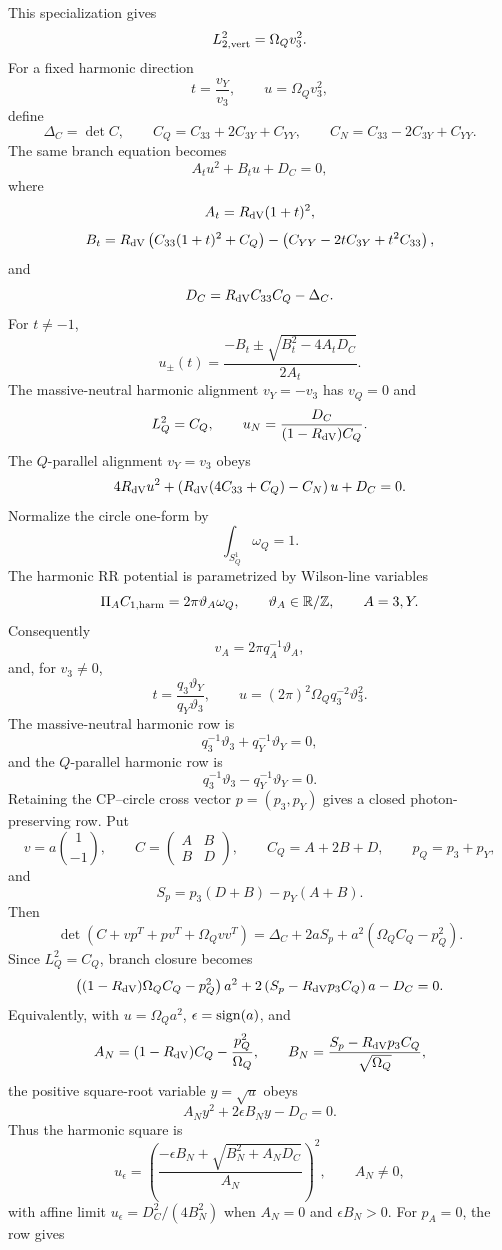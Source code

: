 \documentclass[11pt]{article}
\theoremstyle{definition}
\theoremstyle{remark}
\begin{document}
This specialization gives
\[
  L_{2,{\rm vert}}^2=\Omega_Qv_3^2 .
\]
For a fixed harmonic direction
\[
  t=\frac{v_Y}{v_3},
  \qquad
  u=\Omega_Qv_3^2,
\]
define
\[
  \Delta_C=\det C,
  \qquad
  C_Q=C_{33}+2C_{3Y}+C_{YY},
  \qquad
  C_N=C_{33}-2C_{3Y}+C_{YY}.
\]
The same branch equation becomes
\[
  A_tu^2+B_tu+D_C=0,
\]
where
\[
  A_t=R_{\rm dV}(1+t)^2,
\]
\[
  B_t=
  R_{\rm dV}\left(C_{33}(1+t)^2+C_Q\right)
  -\left(C_{YY}-2tC_{3Y}+t^2C_{33}\right),
\]
and
\[
  D_C=R_{\rm dV}C_{33}C_Q-\Delta_C .
\]
For \(t\ne-1\),
\[
  u_\pm(t)=
  \frac{-B_t\pm\sqrt{B_t^2-4A_tD_C}}{2A_t}.
\]
The massive-neutral harmonic alignment \(v_Y=-v_3\) has \(v_Q=0\) and
\[
  L_Q^2=C_Q,
  \qquad
  u_N=\frac{D_C}{(1-R_{\rm dV})C_Q}.
\]
The \(Q\)-parallel alignment \(v_Y=v_3\) obeys
\[
  4R_{\rm dV}u^2+
  \left(R_{\rm dV}(4C_{33}+C_Q)-C_N\right)u+D_C=0 .
\]
Normalize the circle one-form by
\[
  \int_{S^1_Q}\omega_Q=1 .
\]
The harmonic RR potential is parametrized by Wilson-line variables
\[
  \Pi_A C_{1,{\rm harm}}=2\pi\vartheta_A\omega_Q,
  \qquad
  \vartheta_A\in\mathbb R/\mathbb Z,
  \qquad A=3,Y.
\]
Consequently
\[
  v_A=2\pi q_A^{-1}\vartheta_A,
\]
and, for \(v_3\ne0\),
\[
  t=\frac{q_3\vartheta_Y}{q_Y\vartheta_3},
  \qquad
  u=(2\pi)^2\Omega_Q q_3^{-2}\vartheta_3^2 .
\]
The massive-neutral harmonic row is
\[
  q_3^{-1}\vartheta_3+q_Y^{-1}\vartheta_Y=0,
\]
and the \(Q\)-parallel harmonic row is
\[
  q_3^{-1}\vartheta_3-q_Y^{-1}\vartheta_Y=0 .
\]
Retaining the CP--circle cross vector \(p=(p_3,p_Y)\) gives a closed
photon-preserving row.  Put
\[
  v=a\binom{1}{-1},
  \qquad
  C=
  \begin{pmatrix}
  A&B\\B&D
  \end{pmatrix},
  \qquad
  C_Q=A+2B+D,
  \qquad
  p_Q=p_3+p_Y,
\]
and
\[
  S_p=p_3(D+B)-p_Y(A+B).
\]
Then
\[
  \det(C+vp^T+pv^T+\Omega_Qvv^T)
  =
  \Delta_C+2aS_p
  +a^2(\Omega_QC_Q-p_Q^2).
\]
Since \(L_Q^2=C_Q\), branch closure becomes
\[
  \left((1-R_{\rm dV})\Omega_QC_Q-p_Q^2\right)a^2
  +2\left(S_p-R_{\rm dV}p_3C_Q\right)a
  -D_C=0 .
\]
Equivalently, with \(u=\Omega_Qa^2\), \(\epsilon={\rm sign}(a)\), and
\[
  A_N=(1-R_{\rm dV})C_Q-\frac{p_Q^2}{\Omega_Q},
  \qquad
  B_N=\frac{S_p-R_{\rm dV}p_3C_Q}{\sqrt{\Omega_Q}},
\]
the positive square-root variable \(y=\sqrt u\) obeys
\[
  A_Ny^2+2\epsilon B_Ny-D_C=0 .
\]
Thus the harmonic square is
\[
  u_{\epsilon}
  =
  \left(
  \frac{-\epsilon B_N+\sqrt{B_N^2+A_ND_C}}{A_N}
  \right)^2,
  \qquad A_N\ne0,
\]
with affine limit \(u_\epsilon=D_C^2/(4B_N^2)\) when
\(A_N=0\) and \(\epsilon B_N>0\).  For \(p_A=0\), the row gives
\end{document}
